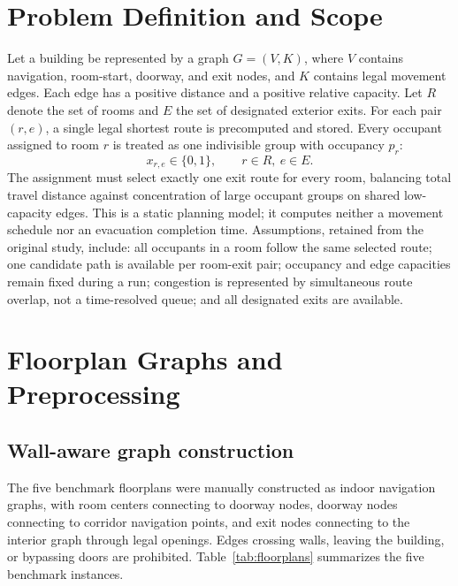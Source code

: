 \documentclass[11pt]{article}
\begin{document}
\section{Problem Definition and Scope}

Let a building be represented by a graph $G=(V,K)$, where $V$ contains navigation, room-start, doorway, and exit nodes, and $K$ contains legal movement edges. Each edge has a positive distance and a positive relative capacity. Let $R$ denote the set of rooms and $E$ the set of designated exterior exits. For each pair $(r,e)$, a single legal shortest route is precomputed and stored. Every occupant assigned to room $r$ is treated as one indivisible group with occupancy $p_r$:
\begin{equation}
x_{r,e} \in \{0,1\}, \qquad r \in R,\ e \in E. \tag{1}
\end{equation}
The assignment must select exactly one exit route for every room, balancing total travel distance against concentration of large occupant groups on shared low-capacity edges. This is a static planning model; it computes neither a movement schedule nor an evacuation completion time. Assumptions, retained from the original study, include: all occupants in a room follow the same selected route; one candidate path is available per room-exit pair; occupancy and edge capacities remain fixed during a run; congestion is represented by simultaneous route overlap, not a time-resolved queue; and all designated exits are available.

\section{Floorplan Graphs and Preprocessing}

\subsection{Wall-aware graph construction}
The five benchmark floorplans were manually constructed as indoor navigation graphs, with room centers connecting to doorway nodes, doorway nodes connecting to corridor navigation points, and exit nodes connecting to the interior graph through legal openings. Edges crossing walls, leaving the building, or bypassing doors are prohibited. Table~\ref{tab:floorplans} summarizes the five benchmark instances.
\end{document}

